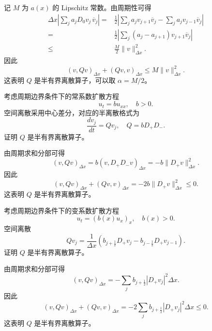 \begin{solution*}
    记 $M$ 为 $a(x)$ 的 Lipschitz 常数。由周期性可得
    \begin{align*}
        \Delta x\left|\sum_j a_jD_0v_j\,\overline{v}_j\right|
        ={}   & \frac12\left|
        \sum_j a_jv_{j+1}\overline{v}_j-\sum_j a_jv_{j-1}\overline{v}_j
        \right|                                                               \\
        ={}   & \frac12\left|\sum_j (a_j-a_{j+1})v_{j+1}\overline{v}_j\right| \\
        \le{} & \frac{M}{2}\|v\|_{\Delta x}^2.
    \end{align*}
    因此
    \[
        (v,Qv)_{\Delta x}+(Qv,v)_{\Delta x}
        \le M\|v\|_{\Delta x}^2.
    \]
    这表明 $Q$ 是半有界离散算子，可以取 $\alpha=M/2$。
\end{solution*}

\begin{example}
    考虑周期边界条件下的常系数扩散方程
    \[
        u_t = b u_{xx},\quad b>0.
    \]
    空间离散采用中心差分，对应的半离散格式为
    \[
        \frac{d v_j}{dt} = Q v_j,\quad Q = bD_+D_-.
    \]
    证明 $Q$ 是半有界离散算子。
\end{example}

\begin{solution*}
    由周期求和分部可得
    \[
        (v,Qv)_{\Delta x}
        = b(v,D_+D_-v)_{\Delta x}
        = -b\|D_+v\|_{\Delta x}^2.
    \]
    因此
    \[
        (v,Qv)_{\Delta x} + (Qv,v)_{\Delta x}
        = -2b\|D_+v\|_{\Delta x}^2 \le 0.
    \]
    这表明 $Q$ 是半有界离散算子。
\end{solution*}

\begin{example}
    考虑周期边界条件下的变系数扩散方程
    \[
        u_t=(b(x)u_x)_x,\quad b(x)>0.
    \]
    空间离散
    \[
        Qv_j =
        \frac{1}{\Delta x}\left(
        b_{j+\frac12}D_+v_j - b_{j-\frac12}D_+v_{j-1}
        \right).
    \]
    证明 $Q$ 是半有界离散算子。
\end{example}

\begin{solution*}
    由周期求和分部可得
    \[
        (v,Qv)_{\Delta x}
        =
        -\sum_j b_{j+\frac12}|D_+v_j|^2\Delta x.
    \]
    因此
    \[
        (v,Qv)_{\Delta x}+(Qv,v)_{\Delta x}
        =
        -2\sum_j b_{j+\frac12}|D_+v_j|^2\Delta x\le0.
    \]
    这表明 $Q$ 是半有界离散算子。
\end{solution*}




